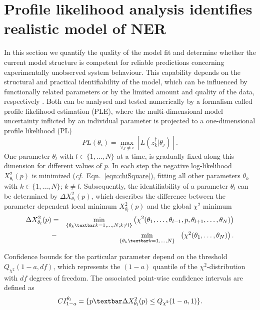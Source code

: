 \section{Profile likelihood analysis identifies realistic model of NER}
\label{sec:identifiabilityAnalysis}
In this section we quantify the quality of the model fit and determine whether the current model structure is competent for reliable predictions concerning experimentally unobserved system behaviour. This capability depends on the structural and practical identifiability of the model, which can be influenced by functionally related parameters or by the limited amount and quality of the data, respectively \cite{Cobelli1980,Swameye2003}. Both can be analysed and tested numerically by a formalism called profile likelihood estimation (PLE)\label{sec:PLE}\cite{Venzon1988,Murphy2000,Raue2009}, where the multi-dimensional model uncertainty inflicted by an individual parameter is projected to a one-dimensional profile likelihood (PL)
\begin{equation}
PL(\theta_i) = \max_{\forall j \neq i} [L(z_k^\dag \lvert \theta_j)].
\label{eqn:PL} 
\end{equation}
One parameter $\theta_l$ with $l\in\{{1,\ldots,N}\}$ at a time, is gradually fixed along this dimension for different values of $p$. In each step the negative log-likelihood $X_{\theta_l}^2(p)$ is minimized (\textit{cf.}\ Eqn.\ \ref{eqn:chiSquare}), fitting all other parameters $\theta_k$ with $k\in\{{1,\ldots,N}\}$; $k\neq l$. Subsequently, the identifiability of a parameter $\theta_l$ can be determined by $\Delta X_{\theta_l}^2(p)$, which describes the difference between the parameter dependent local minimum $X_{\theta_l}^2(p)$ and the global $\chi^{2}$ minimum
\begin{eqnarray}
	\Delta X_{\theta_l}^2(p) &=& \min_{\{\theta_k\textbar k=1,\ldots,N;k\neq l\}} \left( \chi^{2} (\theta_1,\ldots,\theta_{l-1},p,\theta_{l+1},\ldots,\theta_N )\right)\nonumber \\
	&-& \quad \! \min_{\{\theta_k\textbar k=1,\ldots,N\}} \quad \!\! \left( \chi^{2} (\theta_1,\ldots,\theta_N )\right).
\end{eqnarray}  

Confidence bounds for the particular parameter depend on the threshold $Q_{\chi^{2}}(1-a,df)$, which represents the $(1-a)$ quantile of the $\chi^{2}$-distribution with $df$ degrees of freedom. The associated point-wise confidence intervals are defined as
\begin{equation}
CI_{1-a}^{\theta_l}= \{p\textbar \Delta X_{\theta_l}^2(p)\leq Q_{\chi^{2}}(1-a,1)\}.
\label{eqn:confidenceIntervals}
\end{equation} 

